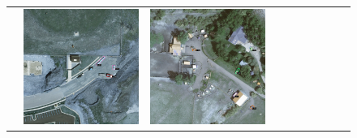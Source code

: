 \begin{figure}[H]
\begin{tabularx}{\textwidth}{c|*{9}{X}}
    & \includegraphics[trim={440pt 360pt 460pt 555pt},clip,width=\linewidth]{images/015Results/02perm_exp/comp_images/rgbir/427.png}
    & \includegraphics[trim={740pt 420pt 180pt 510pt},clip,width=\linewidth]{images/015Results/02perm_exp/comp_images/rgbir/523.png}

\end{tabularx}
\end{figure}
